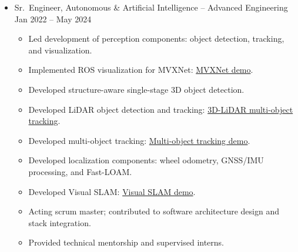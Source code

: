 \documentclass[a4paper,10pt,dvipdfmx]{article}
\begin{document}
\begin{itemize}[noitemsep,nolistsep]
\begin{itemize}[noitemsep,nolistsep]
      \item Designed a layered \href{https://chris7462.github.io/docs/hpc/admin/slurm/enforcement}{enforcement daemon} (cgroup membership, \texttt{SLURM\_JOB\_ID} environment checks, and parent/grandparent process inspection) that automatically warns and terminates non-SLURM compute workloads via custom systemd services, while correctly exempting legitimate jobs spawned from IDEs running inside SLURM sessions.
      \item Built \href{https://chris7462.github.io/docs/hpc/admin/user-management}{HPC user and group management} infrastructure with disk quotas, Docker access control, shared project workspaces, automated onboarding scripts, and documented procedures (UID/GID mapping, Munge authentication) for \href{https://chris7462.github.io/docs/hpc/admin/slurm/adding-a-node}{adding new compute nodes}.
      \item Authored internal \href{https://chris7462.github.io/docs/hpc}{SLURM and HPC documentation} to standardize GPU job submission, debugging workflows, and best practices across engineering teams.
    \end{itemize}
  \item[] Sr.~Engineer, Autonomous \& Artificial Intelligence -- Advanced Engineering \hfill Jan 2022 -- May 2024
    \begin{itemize}[noitemsep,nolistsep]
      \item Led development of perception components: object detection, tracking, and visualization.
      \item[] Implemented ROS visualization for MVXNet: \href{https://youtu.be/LQHUm6AnVdg}{MVXNet demo}.
      \item[] Developed structure-aware single-stage 3D object detection.
      \item[] Developed LiDAR object detection and tracking: \href{https://youtu.be/hfo4PdJBrFU}{3D-LiDAR multi-object tracking}.
      \item[] Developed multi-object tracking: \href{https://youtu.be/WCiK4gFPqtM}{Multi-object tracking demo}.
      \item Developed localization components: wheel odometry, GNSS/IMU processing, and Fast-LOAM.
      \item[] Developed Visual SLAM: \href{https://youtu.be/Z5XTmDap_Pk}{Visual SLAM demo}.
      \item Acting scrum master; contributed to software architecture design and stack integration.
      \item Provided technical mentorship and supervised interns.

\end{itemize}
\end{itemize}
\end{document}
